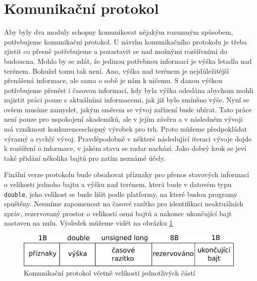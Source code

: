 	\section{Komunikační protokol}\label{navrhReseni::protokol}	
		Aby byly dva moduly schopny komunikovat nějakým rozumným způsobem, potřebujeme komunikační protokol.
		U návrhu komunikačního protokolu je třeba zjistit co přesně potřebujeme a pozastavit se nad možnými rozšířeními do budoucna. Mohlo by se zdát, že jedinou potřebnou informací je výška letadla nad terénem. Bohužel tomu tak není. Ano, výška nad terénem je nejdůležitější přenášená informace, ale sama o sobě je nám k ničemu. S danou výškou potřebujeme přenést i časovou informaci, kdy byla výška odeslána abychom mohli zajistit práci pouze s aktuálními informacemi, jak již bylo zmíněno výše. Nyní se ovšem musíme zamyslet, jakým směrem se vývoj zařízení bude ubírat. Tato práce není pouze pro uspokojení akademiků, ale v jejím závěru a v následném vývoji má vzniknout konkurenceschopný výrobek pro trh. Proto můžeme předpokládat výrazný a rychlý vývoj. Pravděpodobně v některé následující iteraci vývoje dojde k rozšíření o informace, v jakém stavu se radar nachází. Jako dobrý krok se jeví také přidání několika bajtů pro zatím neznámé účely.\par
		Finální verze protokolu bude obsahovat příznaky pro přenos stavových informací o velikosti jednoho bajtu a výšku nad terénem, která bude v datovém typu \texttt{double}, jeho velikost se bude lišit podle platformy, na které budou programy spuštěny. Nesmíme zapomenout na časové razítko pro identifikaci neaktuálních zpráv, rezervovaný prostor o velikosti osmi bajtů a nakonec ukončující bajt nastaven na nulu. Výsledek můžeme vidět na obrázku \ref{navrh::protokol}
		
		\begin{figure}[H]
			\begin{center}
				\includegraphics[scale=0.7]{obrazky-figures/protokol.png}
				\caption{Komunikační protokol včetně velikostí jednotlivých částí}
				\label{navrh::protokol}
			\end{center}
		\end{figure}
		

		
		
